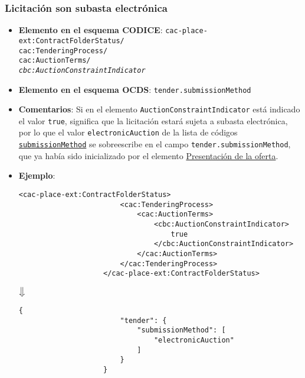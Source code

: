         \subsubsection{Licitación son subasta electrónica}
        \begin{itemize}
            \item \textbf{Elemento en el esquema CODICE}:
                \tabto{7.6cm} \texttt{cac-place-ext:ContractFolderStatus/} \\
                \tabto{7.6cm} \texttt{cac:TenderingProcess/} \\
                \tabto{7.6cm} \texttt{cac:AuctionTerms/} \\
                \tabto{7.6cm} \texttt{\textit{cbc:AuctionConstraintIndicator}}
            \item \textbf{Elemento en el esquema OCDS}:
                \tabto{7.6cm} \texttt{tender.submissionMethod}
            \item \textbf{Comentarios}: Si en el elemento \texttt{AuctionConstraintIndicator} está indicado el valor \texttt{true}, significa que la licitación estará sujeta a subasta electrónica, por lo que el valor \texttt{electronicAuction} de la lista de códigos \href{https://standard.open-contracting.org/latest/es/schema/codelists/#submission-method}{\texttt{submissionMethod}} se sobreescribe en el campo \texttt{tender.submissionMethod}, que ya había sido inicializado por el elemento \hyperref[subsec:PresentacionOferta]{Presentación de la oferta}.
            \item \textbf{Ejemplo}: \\
                \begin{lstlisting}[language=lXML]
                    <cac-place-ext:ContractFolderStatus>
                        <cac:TenderingProcess>
                            <cac:AuctionTerms>
                                <cbc:AuctionConstraintIndicator>
                                    true
                                </cbc:AuctionConstraintIndicator>
                            </cac:AuctionTerms>
                        </cac:TenderingProcess>
                    </cac-place-ext:ContractFolderStatus>
                \end{lstlisting}
                
                \begin{center}
                    $\big\Downarrow$
                \end{center}
                
                \begin{lstlisting}[language=lJSON]
                    {
                        "tender": {
                            "submissionMethod": [
                                "electronicAuction"
                            ]
                        }
                    }
                \end{lstlisting}
        \end{itemize}

\newpage